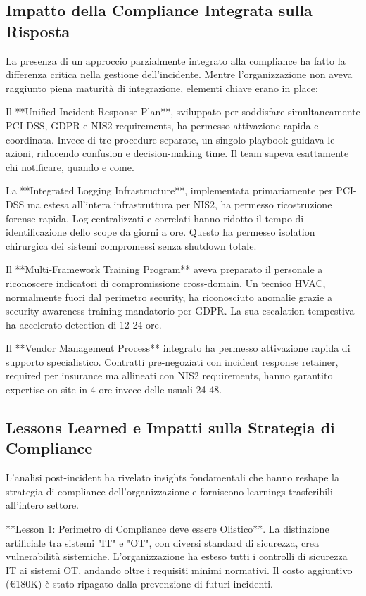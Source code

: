 \subsection{Impatto della Compliance Integrata sulla Risposta}

La presenza di un approccio parzialmente integrato alla compliance ha fatto la differenza critica nella gestione dell'incidente. Mentre l'organizzazione non aveva raggiunto piena maturità di integrazione, elementi chiave erano in place:

Il **Unified Incident Response Plan**, sviluppato per soddisfare simultaneamente PCI-DSS, GDPR e NIS2 requirements, ha permesso attivazione rapida e coordinata. Invece di tre procedure separate, un singolo playbook guidava le azioni, riducendo confusion e decision-making time. Il team sapeva esattamente chi notificare, quando e come.

La **Integrated Logging Infrastructure**, implementata primariamente per PCI-DSS ma estesa all'intera infrastruttura per NIS2, ha permesso ricostruzione forense rapida. Log centralizzati e correlati hanno ridotto il tempo di identificazione dello scope da giorni a ore. Questo ha permesso isolation chirurgica dei sistemi compromessi senza shutdown totale.

Il **Multi-Framework Training Program** aveva preparato il personale a riconoscere indicatori di compromissione cross-domain. Un tecnico HVAC, normalmente fuori dal perimetro security, ha riconosciuto anomalie grazie a security awareness training mandatorio per GDPR. La sua escalation tempestiva ha accelerato detection di 12-24 ore.

Il **Vendor Management Process** integrato ha permesso attivazione rapida di supporto specialistico. Contratti pre-negoziati con incident response retainer, required per insurance ma allineati con NIS2 requirements, hanno garantito expertise on-site in 4 ore invece delle usuali 24-48.

\subsection{Lessons Learned e Impatti sulla Strategia di Compliance}

L'analisi post-incident ha rivelato insights fondamentali che hanno reshape la strategia di compliance dell'organizzazione e forniscono learnings trasferibili all'intero settore.

**Lesson 1: Perimetro di Compliance deve essere Olistico**. La distinzione artificiale tra sistemi "IT" e "OT", con diversi standard di sicurezza, crea vulnerabilità sistemiche. L'organizzazione ha esteso tutti i controlli di sicurezza IT ai sistemi OT, andando oltre i requisiti minimi normativi. Il costo aggiuntivo (€180K) è stato ripagato dalla prevenzione di futuri incidenti.

